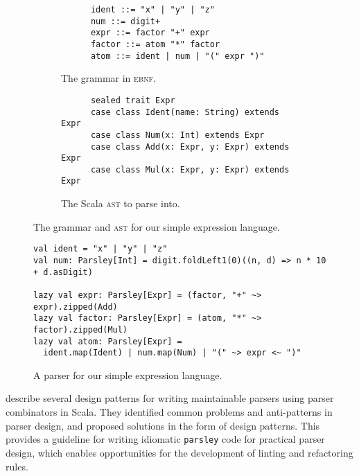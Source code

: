 \documentclass[../../main.tex]{subfiles}
\begin{document}
\begin{figure}[htbp]
  \centering
  \begin{subfigure}{0.6\textwidth}
    \vspace{3ex} %
    \centering
    \begin{verbatim}
      ident ::= "x" | "y" | "z"
      num ::= digit+
      expr ::= factor "+" expr
      factor ::= atom "*" factor
      atom ::= ident | num | "(" expr ")"
    \end{verbatim}
    \caption{The grammar in \textsc{ebnf}.}
    \label{fig:simple-grammar-ebnf}
  \end{subfigure}
  \begin{subfigure}{0.8\textwidth}
    \vspace{5ex} %
    \centering
    \begin{verbatim}
      sealed trait Expr
      case class Ident(name: String) extends Expr
      case class Num(x: Int) extends Expr
      case class Add(x: Expr, y: Expr) extends Expr
      case class Mul(x: Expr, y: Expr) extends Expr
    \end{verbatim}
    \caption{The Scala \textsc{ast} to parse into.}
    \label{fig:simple-grammar-ast}
  \end{subfigure}
  \caption{The grammar and \textsc{ast} for our simple expression language.}
\end{figure}

\begin{figure}[htbp]
\centering
\begin{verbatim}
val ident = "x" | "y" | "z"
val num: Parsley[Int] = digit.foldLeft1(0)((n, d) => n * 10 + d.asDigit)

lazy val expr: Parsley[Expr] = (factor, "+" ~> expr).zipped(Add)
lazy val factor: Parsley[Expr] = (atom, "*" ~> factor).zipped(Mul)
lazy val atom: Parsley[Expr] =
  ident.map(Ident) | num.map(Num) | "(" ~> expr <~ ")"
\end{verbatim}
\caption{A parser for our simple expression language.}
\label{fig:simple-grammar-parser}
\end{figure}

\textcite{willis_design_2022} describe several design patterns for writing maintainable parsers using parser combinators in Scala.
They identified common problems and anti-patterns in parser design, and proposed solutions in the form of design patterns.
This provides a guideline for writing idiomatic \texttt{parsley} code for practical parser design, which enables opportunities for the development of linting and refactoring rules.
\end{document}
